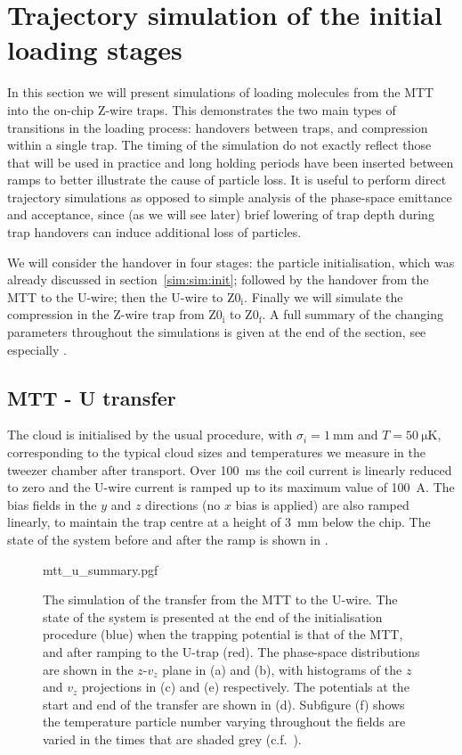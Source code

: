 \section{Trajectory simulation of the initial loading stages}

In this section we will present simulations of loading molecules from the MTT
into the on-chip Z-wire traps. 
This demonstrates
the two main types of transitions in the loading process: handovers between
traps, and compression within a single trap. The timing of the simulation do
not exactly reflect those that will be used in practice and long holding periods
have been inserted between ramps to better illustrate the cause of particle
loss. It is useful to perform direct trajectory simulations as opposed to
simple analysis of the phase-space emittance and acceptance, since (as we will
see later) brief lowering of trap depth during trap handovers can induce
additional loss of particles.

We will consider the handover in four stages: the particle initialisation, which
was already discussed in section~\ref{sim:sim:init}; followed by the
handover from the MTT to the U-wire; then the U-wire to $\mathrm{Z0_i}$.
Finally we will simulate the compression in the Z-wire trap from
$\mathrm{Z0_i}$ to $\mathrm{Z0_f}$. A full summary of the changing parameters
throughout the simulations is given at the end of the section, see especially
.

\subsection{MTT - U transfer}
\label{sim:sim:trans_U}

The cloud is initialised by the usual procedure, with $\sigma_i =
\SI{1}{\milli\meter}$ and $T=\SI{50}{\micro\kelvin}$, corresponding to the
typical cloud sizes and temperatures we measure in the tweezer chamber after
transport. Over \SI{100}{\milli\second} the coil current is linearly
reduced to zero and the U-wire current is ramped up to its maximum value of
\SI{100}{\ampere}. The bias fields in the $y$ and $z$ directions (no $x$ bias
is applied) are also ramped linearly, to maintain the trap centre at a height
of \SI{3}{\milli\meter} below the chip. The state of the system before and
after the ramp is shown in .

\begin{figure}[p]
\centering
  {mtt_u_summary.pgf}
  \caption{
    The simulation of the transfer from the MTT to the U-wire. The state of the
    system is presented at the end of the initialisation procedure (blue) when
    the trapping potential is that of the MTT, and after ramping to the U-trap
    (red). The phase-space distributions are shown in the $z$-$v_z$ plane in
    (a) and (b), with histograms of the $z$ and $v_z$ projections in (c) and
    (e) respectively. The potentials at the start and end of the transfer are
    shown in (d). Subfigure (f) shows the temperature particle number varying
    throughout the fields are varied in the times that are shaded grey
    (c.f.~).
  }
  \label{sim:fig:mttusim}
\end{figure}

